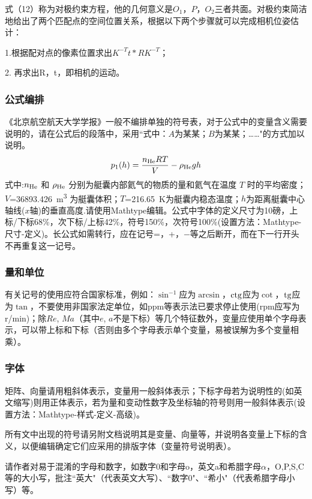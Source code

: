 \documentclass[10.5pt,twocolumn]{jbuaa}
\begin{document}
式（12）称为对极约束方程，他的几何意义是$ O_{1}，P，O_{2} $三者共面。对极约束简洁地给出了两个匹配点的空间位置关系，根据以下两个步骤就可以完成相机位姿估计：

1.根据配对点的像素位置求出$ K^{-T}t * RK^{-T} $；

2. 再求出R，t，即相机的运动。

\subsubsection{公式编排}
\label{labSecForm}
《北京航空航天大学学报》一般不编排单独的符号表，对于公式中的变量含义需要说明的，请在公式后的段落中，采用``式中：$A$为某某；$B$为某某；……"的方式加以说明。
\begin{equation}
\label{eqnLabelp}
p_1 (h) = \dfrac{n_{\textnormal{He}}RT}{V}-\rho_{\textnormal{He}}gh
\end{equation}
式中:$n_{\textnormal{He}}$ 和 $\rho_{\textnormal{He}}$ 分别为艇囊内部氦气的物质的量和氦气在温度 $T$ 时的平均密度；
$V$=\SI{36893.426}{\cubic\meter}%
为艇囊体积；$T$=\SI{216.65}{\kelvin}为艇囊内稳态温度；$h$为距离艇囊中心轴线($x$轴)的垂直高度.请使用Mathtype编辑。公式中字体的定义尺寸为10磅，上标/下标68\%，次下标/上标42\%，符号150\%，次符号100\%(设置方法：Mathtype-尺寸-定义)。长公式如需转行，应在记号=，+，$-$等之后断开，而在下一行开头不再重复这一记号。

\subsubsection{量和单位}
有关记号的使用应符合国家标准，例如：$\sin^{-1}$应为$\arcsin$，$\rm ctg$应为$\cot$，$\rm tg$应为$\tan$，不要使用非国家法定单位，如ppm等表示法已要求停止使用(rpm应写为r/min)；除$Re$, $Ma$（其中$e$, $a$不是下标）等几个特征数外，变量应使用单个字母表示，可以带上标和下标（否则由多个字母表示单个变量，易被误解为多个变量相乘）。

\subsubsection{字体}
矩阵、向量请用粗斜体表示，变量用一般斜体表示；下标字母若为说明性的(如英文缩写)则用正体表示，若为量和变动性数字及坐标轴的符号则用一般斜体表示(设置方法：Mathtype-样式-定义-高级)。

所有文中出现的符号请另附文档说明其是变量、向量等，并说明各变量上下标的含义，以便编辑确定它们应采用的排版字体（变量符号说明表）。

请作者对易于混淆的字母和数字，如数字0和字母o，英文a和希腊字母$\alpha$，O,P,S,C等的大小写，批注``英大"（代表英文大写）、``数字0"、``希小"（代表希腊字母小写）等。
\end{document}
